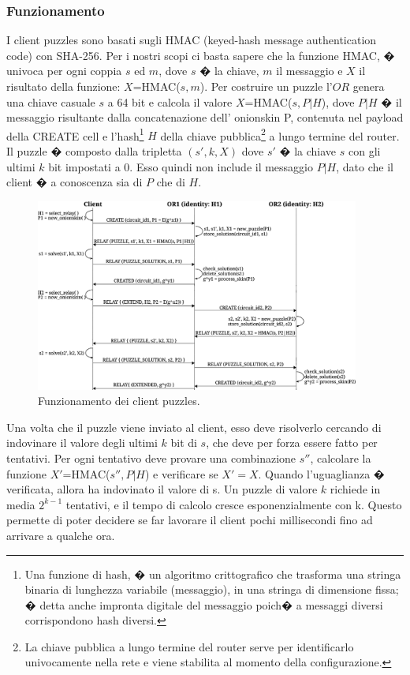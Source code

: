 \subsubsection{Funzionamento}
I client puzzles sono basati sugli HMAC (keyed-hash message authentication code) con SHA-256. Per i nostri scopi ci basta sapere che la funzione HMAC, � univoca per ogni coppia $s$ ed $m$, dove $s$ � la chiave, $m$ il messaggio e $X$ il risultato della funzione: $X$=HMAC($s,m$). Per costruire un puzzle l'$OR$ genera una chiave casuale $s$ a 64 bit e calcola il valore $X$=HMAC($s, P|H$), dove $P|H$ � il messaggio risultante dalla concatenazione dell' onionskin P, contenuta nel payload della {\ttfamily CREATE} cell e l'hash\footnote{Una funzione di hash, � un algoritmo crittografico che trasforma una stringa binaria di lunghezza variabile (messaggio), in una stringa di dimensione fissa; � detta anche impronta digitale del messaggio poich� a messaggi diversi corrispondono hash diversi.} $H$ della chiave pubblica\footnote{La chiave pubblica a lungo termine del router serve per identificarlo univocamente nella rete e viene stabilita al momento della configurazione.} a lungo termine del router. 
Il puzzle � composto dalla tripletta $(s',k,X)$ dove $s'$ � la chiave $s$ con gli ultimi $k$ bit impostati a 0. Esso quindi non include il messaggio $P|H$, dato che il client � a conoscenza sia di $P$ che di $H$. 
\begin{figure}[!htbp]
\centering
\includegraphics[width=0.95\textwidth]{./figure//clientpuzzles}
\caption{Funzionamento dei client puzzles.}
\label{FIG:ClientPuzzles}
\end{figure}
Una volta che il puzzle viene inviato al client, esso deve risolverlo cercando di indovinare il valore degli ultimi $k$ bit di $s$, che deve per forza essere fatto per tentativi. Per ogni tentativo deve provare una combinazione $s''$, calcolare la funzione $X'$=HMAC($s'', P|H$) e verificare se $X'=X$. Quando l'uguaglianza � verificata, allora ha indovinato il valore di s. Un puzzle di valore $k$ richiede in media $2^{k-1}$ tentativi, e il tempo di calcolo cresce esponenzialmente con k. Questo permette di poter decidere se far lavorare il client pochi millisecondi fino ad arrivare a qualche ora.

